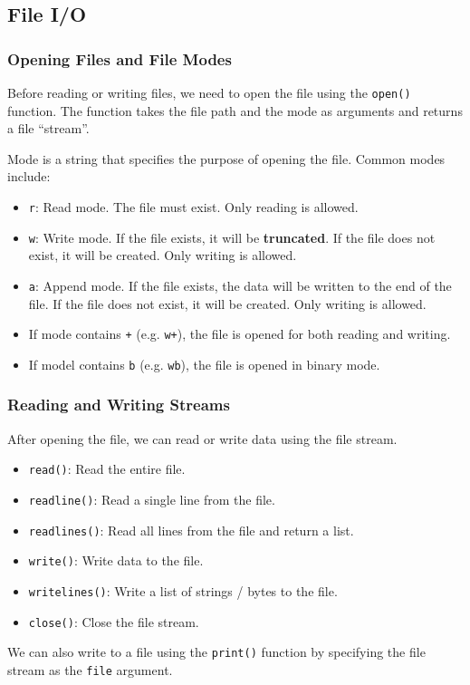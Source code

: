 \documentclass[beamer, en, version=2.0]{huangfusl-template}
\begin{document}
    \subsection{File I/O}
    \begin{frame}[fragile]
        \frametitle{Opening Files and File Modes}

        Before reading or writing files, we need to open the file using the {\footnotesize\verb|open()|} function. The function takes the file path and the mode as arguments and returns a file ``stream''.

        Mode is a string that specifies the purpose of opening the file. Common modes include:

        \begin{itemize}
            \item {\footnotesize\verb|r|}: Read mode. The file must exist. Only reading is allowed.
            \item {\footnotesize\verb|w|}: Write mode. If the file exists, it will be \textbf{truncated}. If the file does not exist, it will be created. Only writing is allowed.
            \item {\footnotesize\verb|a|}: Append mode. If the file exists, the data will be written to the end of the file. If the file does not exist, it will be created. Only writing is allowed.
            \item If mode contains {\footnotesize\verb|+|} (e.g. {\footnotesize\verb|w+|}), the file is opened for both reading and writing.
            \item If model contains {\footnotesize\verb|b|} (e.g. {\footnotesize\verb|wb|}), the file is opened in binary mode.
        \end{itemize}
    \end{frame}
    \begin{frame}[fragile]
        \frametitle{Reading and Writing Streams}

        After opening the file, we can read or write data using the file stream.

        \begin{itemize}
            \item {\footnotesize\verb|read()|}: Read the entire file.
            \item {\footnotesize\verb|readline()|}: Read a single line from the file.
            \item {\footnotesize\verb|readlines()|}: Read all lines from the file and return a list.
            \item {\footnotesize\verb|write()|}: Write data to the file.
            \item {\footnotesize\verb|writelines()|}: Write a list of strings / bytes to the file.
            \item {\footnotesize\verb|close()|}: Close the file stream.
        \end{itemize}

        We can also write to a file using the {\footnotesize\verb|print()|} function by specifying the file stream as the {\footnotesize\verb|file|} argument.
    \end{frame}
\end{document}
